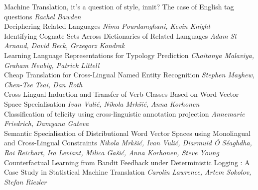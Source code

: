 \documentclass{book}
\begin{document}
    \noindent	Machine Translation, it's a question of style, innit? The case of English tag questions \newline 
    {\itshape Rachel Bawden} \\
    
    \noindent	Deciphering Related Languages \newline 
    {\itshape Nima Pourdamghani, Kevin Knight} \\
    
    \noindent	Identifying Cognate Sets Across Dictionaries of Related Languages \newline 
    {\itshape Adam St Arnaud, David Beck, Grzegorz Kondrak} \\
    
    \noindent	Learning Language Representations for Typology Prediction \newline 
    {\itshape Chaitanya Malaviya, Graham Neubig, Patrick Littell} \\
    
    \noindent	Cheap Translation for Cross-Lingual Named Entity Recognition \newline 
    {\itshape Stephen Mayhew, Chen-Tse Tsai, Dan Roth} \\
    
    \noindent	Cross-Lingual Induction and Transfer of Verb Classes Based on Word Vector Space Specialisation \newline 
    {\itshape Ivan Vulić, Nikola Mrkšić, Anna Korhonen} \\
    
    \noindent	Classification of telicity using cross-linguistic annotation projection \newline 
    {\itshape Annemarie Friedrich, Damyana Gateva} \\
    
    \noindent	Semantic Specialisation of Distributional Word Vector Spaces using Monolingual and Cross-Lingual Constraints \newline 
    {\itshape Nikola Mrkšić, Ivan Vulić, Diarmuid Ó Séaghdha, Roi Reichart, Ira Leviant, Milica Gašić, Anna Korhonen, Steve Young} \\
    
    \noindent	Counterfactual Learning from Bandit Feedback under Deterministic Logging : A Case Study in Statistical Machine Translation \newline 
    {\itshape Carolin Lawrence, Artem Sokolov, Stefan Riezler} \\
    
\end{document}
